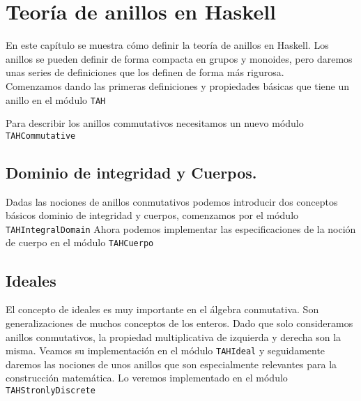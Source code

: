 \chapter{Teoría de anillos en Haskell}\label{sec:anillosHas}

En este capítulo se muestra cómo definir la teoría de anillos en Haskell. Los anillos se pueden definir de forma compacta en grupos y monoides, pero daremos unas series de definiciones que los definen de forma más rigurosa.\\

Comenzamos dando las primeras definiciones y propiedades básicas que tiene un anillo en el módulo \texttt{TAH} 

Para describir los anillos commutativos necesitamos un nuevo módulo \texttt{TAHCommutative}
\section{Dominio de integridad y Cuerpos.}
Dadas las nociones de anillos conmutativos podemos introducir dos conceptos básicos dominio de integridad y cuerpos, comenzamos por el módulo \texttt{TAHIntegralDomain} Ahora podemos implementar las especificaciones de la noción de cuerpo en el módulo \texttt{TAHCuerpo}

\section{Ideales}
El concepto de ideales es muy importante en el álgebra conmutativa. Son
generalizaciones de muchos conceptos de los enteros. Dado que solo consideramos anillos conmutativos, 
la propiedad multiplicativa de izquierda y derecha son la misma. Veamos su implementación en el módulo \texttt{TAHIdeal}
y seguidamente daremos las nociones de unos anillos que son especialmente relevantes para la construcción matemática. Lo veremos implementado en el módulo \texttt{TAHStronlyDiscrete}

